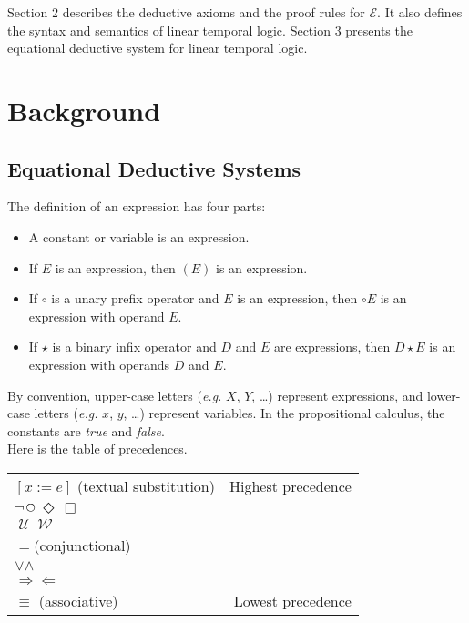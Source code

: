 \documentclass[fleqn, leqno]{article}
\newcommand{\llgap}{6pt}                            %
\newcommand{\impl}{\ensuremath{\Rightarrow}}        %
\newcommand{\foll}{\ensuremath{\Leftarrow}}         %
\newcommand{\Until}{\;\mathcal{U}\;}
\newcommand{\Wait}{\;\mathcal{W}\;}
\newcommand{\Next}{\;\,\text{\raisebox{3.5pt}{\circle{6}}}}
\newcommand{\Event}{\Diamond\,}
\newcommand{\Always}{\Box\,}
\begin{document}
Section 2 describes the deductive axioms and the proof rules for $\mathcal{E}$.
It also defines the syntax and semantics of linear temporal logic.
Section 3 presents the equational deductive system for linear temporal logic.\\

\section{Background}

\subsection{Equational Deductive Systems}

The definition of an expression has four parts:
\begin{itemize}[$\bullet$]
\item A constant or variable is an expression.
\item If $E$ is an expression, then $(E)$ is an expression.
\item If $\circ$ is a unary prefix operator and $E$ is an expression, then $\circ E$ is an expression with operand $E$.
\item If $\star$ is a binary infix operator and $D$ and $E$ are expressions, then $D \star E$ is an expression with operands $D$
and $E$.
\end{itemize}

By convention, upper-case letters ({\itshape e.g.\/} $X$, $Y$, \dots) represent expressions,
and lower-case letters ({\itshape e.g.\/} $x$, $y$, \dots) represent variables.
In the propositional calculus, the constants are {\itshape true\/} and {\itshape false\/}.\\

Here is the table of precedences.\\

\setlength\extrarowheight{2pt}
\begin{tabular}{lr}
\hline
$[x := e]$ (textual substitution) & Highest precedence\\
$\neg$\quad $\Next$\quad $\Event$\quad $\Always$ &\\
$\Until$\quad $\Wait$ &\\
$=$\quad (conjunctional) &\\
$\lor$\quad $\land$ &\\
$\impl$\quad $\foll$ &\\
$\equiv$ \quad (associative) & Lowest precedence\\
\hline
\end{tabular}\\[\llgap]
\end{document}
